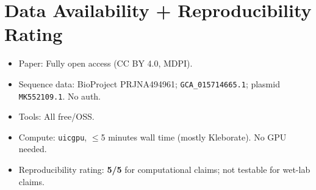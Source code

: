 \documentclass[11pt]{article}
\begin{document}
\section{Data Availability + Reproducibility Rating}
\begin{itemize}
  \item Paper: Fully open access (CC BY 4.0, MDPI).
  \item Sequence data: BioProject PRJNA494961; \texttt{GCA\_015714665.1}; plasmid \texttt{MK552109.1}. No auth.
  \item Tools: All free/OSS.
  \item Compute: \texttt{uicgpu}, $\leq$5 minutes wall time (mostly Kleborate). No GPU needed.
  \item Reproducibility rating: \textbf{5/5} for computational claims; not testable for wet-lab claims.
\end{itemize}
\end{document}
